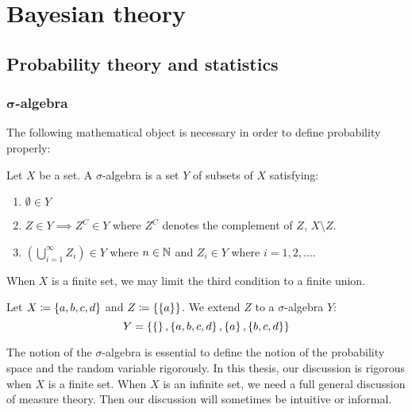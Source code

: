 \chapter{Bayesian theory}
\section{Probability theory and statistics}
\subsection[σ-algebra]{$\boldsymbol\sigma$-algebra}
%
The following mathematical object is necessary in order to define probability properly:

\begin{definition}
  Let $X$ be a set. A $\sigma$-algebra is a set $Y$ of subsets of $X$ satisfying:
  \begin{enumerate}
    \item $\emptyset \in Y$
    \item $Z \in Y \implies Z^C \in Y$ where $Z^C$ denotes the complement of $Z$, $X \setminus Z$.
    \item $\left(\bigcup_{i=1}^\infty Z_i\right) \in Y$ where $n \in \mathbb N$ and $Z_i \in Y$ where $i = 1, 2, \ldots$.
  \end{enumerate}
\end{definition}
When $X$ is a finite set, we may limit the third condition to a finite union.

\begin{example}
  Let $X \coloneqq \left\{a, b, c, d\right\}$ and $Z \coloneqq \left\{\left\{a\right\}\right\}$. We extend $Z$ to a $\sigma$-algebra $Y$:
  \[ Y = \left\{\left\{\right\}, \left\{a,b,c,d\right\}, \left\{a\right\}, \left\{b,c,d\right\}\right\} \]
\end{example}
The notion of the $\sigma$-algebra is essential to define the notion of the probability space and the random variable rigorously.
In this thesis, our discussion is rigorous when $X$ is a finite set.
When $X$ is an infinite set, we need a full general discussion of measure theory.
Then our discussion will sometimes be intuitive or informal.


